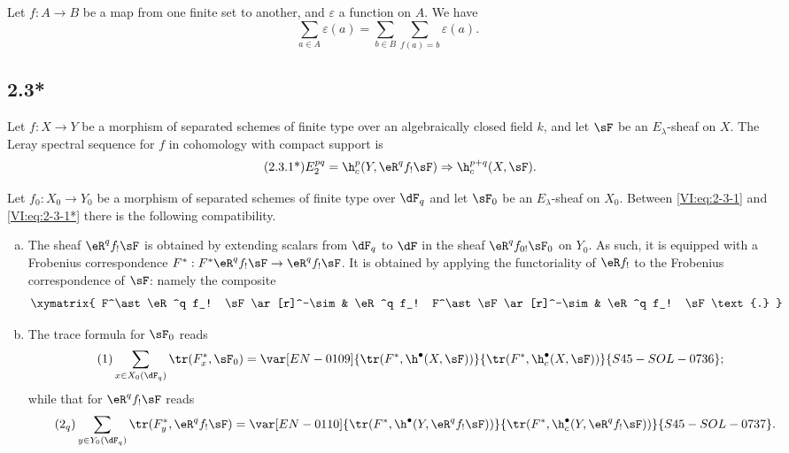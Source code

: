 Let $f:A\to B$ be a map from one finite set to another, and 
$\varepsilon$ a function on $A$. We have 
\begin{equation*}\tag{2.3.1}\label{VI:eq:2-3-1}
  \sum_{a\in A} \varepsilon(a) = \sum_{b\in B} \sum_{f(a)=b} \varepsilon(a) \text{.}
\end{equation*}






\subsection*{2.3*}\label{VI:2-3*}

Let $f:X\to Y$ be a morphism of separated schemes of finite type over an 
algebraically closed field $k$, and let $\sF$ be an $E_\lambda$-sheaf on $X$. The 
Leray spectral sequence for $f$ in cohomology with compact support is 
\begin{align*}\tag{2.3.1*}\label{VI:eq:2-3-1*}
  E_2^{p q} = \h_c^p(Y,\eR^q f_! \sF) \Rightarrow \h_c^{p+q}(X,\sF) \text{.}
\end{align*}

Let $f_0:X_0 \to Y_0$ be a morphism of separated schemes of finite type over 
$\dF_q$ and let $\sF_0$ be an $E_\lambda$-sheaf on $X_0$. Between 
\eqref{VI:eq:2-3-1} and \eqref{VI:eq:2-3-1*} there is the following compatibility. 

\begin{enumerate}[a)]
  \item The sheaf $\eR^q f_! \sF$ is obtained by extending scalars from 
    $\dF_q$ to $\dF$ in the sheaf $\eR^q f_{0!} \sF_0$ on $Y_0$. As 
    such, it is equipped with a Frobenius correspondence 
    $F^\ast:F^\ast\eR^q f_! \sF \to \eR^q f_! \sF$. It is obtained by applying 
    the functoriality of $\eR f_!$ to the Frobenius correspondence of $\sF$: 
    namely the composite 
    \[\xymatrix{
      F^\ast \eR^q f_! \sF \ar[r]^-\sim 
        & \eR^q f_! F^\ast \sF \ar[r]^-\sim 
        & \eR^q f_! \sF \text{.}
    }\]
  \item The trace formula for $\sF_0$ reads 
    \begin{align*}\tag{1}\label{VI:eq:1}
      \sum_{x\in X_0(\dF_q)} \tr(F_x^\ast,\sF_0) = \var[EN-0109]{\tr(F^\ast,\h^\bullet(X,\sF))}{\tr(F^\ast,\h_c^\bullet(X,\sF))}{S45-SOL-0736} \text{;}
    \end{align*}
    while that for $\eR^q f_! \sF$ reads 
    \begin{align*}\tag{2$_q$}\label{VI:eq:2_q} 
      \sum_{y\in Y_0(\dF_q)} \tr(F_y^\ast,\eR^q f_! \sF) = \var[EN-0110]{\tr(F^\ast, \h^\bullet(Y,\eR^q f_! \sF))}{\tr(F^\ast,\h_c^\bullet(Y,\eR^q f_! \sF))}{S45-SOL-0737} \text{.}
    \end{align*}
\end{enumerate}

